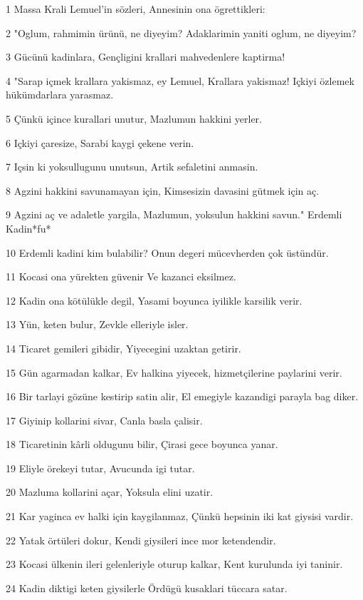 \par 1 Massa Krali Lemuel'in sözleri, Annesinin ona ögrettikleri:
\par 2 "Oglum, rahmimin ürünü, ne diyeyim? Adaklarimin yaniti oglum, ne diyeyim?
\par 3 Gücünü kadinlara, Gençligini krallari mahvedenlere kaptirma!
\par 4 "Sarap içmek krallara yakismaz, ey Lemuel, Krallara yakismaz! Içkiyi özlemek hükümdarlara yarasmaz.
\par 5 Çünkü içince kurallari unutur, Mazlumun hakkini yerler.
\par 6 Içkiyi çaresize, Sarabi kaygi çekene verin.
\par 7 Içsin ki yoksullugunu unutsun, Artik sefaletini anmasin.
\par 8 Agzini hakkini savunamayan için, Kimsesizin davasini gütmek için aç.
\par 9 Agzini aç ve adaletle yargila, Mazlumun, yoksulun hakkini savun." Erdemli Kadin*fu*
\par 10 Erdemli kadini kim bulabilir? Onun degeri mücevherden çok üstündür.
\par 11 Kocasi ona yürekten güvenir Ve kazanci eksilmez.
\par 12 Kadin ona kötülükle degil, Yasami boyunca iyilikle karsilik verir.
\par 13 Yün, keten bulur, Zevkle elleriyle isler.
\par 14 Ticaret gemileri gibidir, Yiyecegini uzaktan getirir.
\par 15 Gün agarmadan kalkar, Ev halkina yiyecek, hizmetçilerine paylarini verir.
\par 16 Bir tarlayi gözüne kestirip satin alir, El emegiyle kazandigi parayla bag diker.
\par 17 Giyinip kollarini sivar, Canla basla çalisir.
\par 18 Ticaretinin kârli oldugunu bilir, Çirasi gece boyunca yanar.
\par 19 Eliyle örekeyi tutar, Avucunda igi tutar.
\par 20 Mazluma kollarini açar, Yoksula elini uzatir.
\par 21 Kar yaginca ev halki için kaygilanmaz, Çünkü hepsinin iki kat giysisi vardir.
\par 22 Yatak örtüleri dokur, Kendi giysileri ince mor ketendendir.
\par 23 Kocasi ülkenin ileri gelenleriyle oturup kalkar, Kent kurulunda iyi taninir.
\par 24 Kadin diktigi keten giysilerle Ördügü kusaklari tüccara satar.
